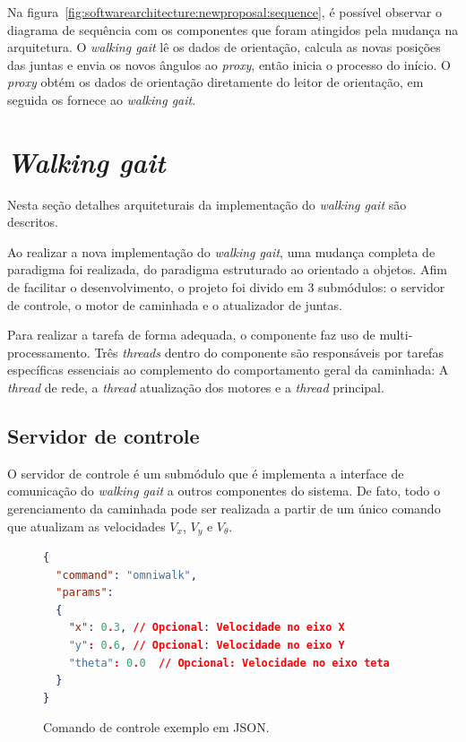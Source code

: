 Na figura~\ref{fig:softwarearchitecture:newproposal:sequence}, é possível observar o diagrama de sequência com os componentes que foram atingidos pela mudança na arquitetura. O \textit{walking gait} lê os dados de orientação, calcula as novas posições das juntas e envia os novos ângulos ao \textit{proxy}, então inicia o processo do início. O \textit{proxy} obtém os dados de orientação diretamente do leitor de orientação, em seguida os fornece ao \textit{walking gait}.

\section{\textit{Walking gait}}

Nesta seção detalhes arquiteturais da implementação do \textit{walking gait} são descritos.

Ao realizar a nova implementação do \textit{walking gait}, uma mudança completa de paradigma foi realizada, do paradigma estruturado ao orientado a objetos. Afim de facilitar o desenvolvimento, o projeto foi divido em $3$ submódulos: o servidor de controle, o motor de caminhada e o atualizador de juntas.

Para realizar a tarefa de forma adequada, o componente faz uso de multi-processamento. Três \textit{threads} dentro do componente são responsáveis por tarefas específicas essenciais ao complemento do comportamento geral da caminhada: A \textit{thread} de rede, a \textit{thread} atualização dos motores e a \textit{thread} principal.

\subsection{Servidor de controle}
\label{subsec:architecture:walkinggait:controlserver}

O servidor de controle é um submódulo que é implementa a interface de comunicação do \textit{walking gait} a outros componentes do sistema. De fato, todo o gerenciamento da caminhada pode ser realizada a partir de um único comando que atualizam as velocidades $V_x$, $V_y$ e $V_\theta$.

\begin{figure}[htb]
	\begin{lstlisting}[language=json,firstnumber=1]
{
  "command": "omniwalk",
  "params":
  {
    "x": 0.3, // Opcional: Velocidade no eixo X
    "y": 0.6, // Opcional: Velocidade no eixo Y
    "theta": 0.0  // Opcional: Velocidade no eixo teta
  }
}
	\end{lstlisting}
	\caption{Comando de controle exemplo em JSON.}
	\label{fig:architecture:walkinggait:controller:json}
\end{figure}

